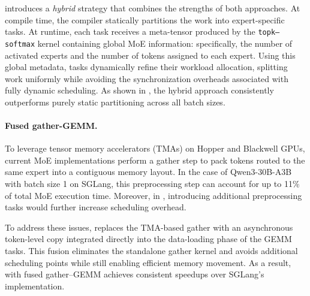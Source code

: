 \sys introduces a {\em hybrid} strategy that combines the strengths of both approaches. At compile time, the compiler statically partitions the work into expert-specific tasks. At runtime, each task receives a meta-tensor produced by the {\tt topk–softmax} kernel containing global MoE information: specifically, the number of activated experts and the number of tokens assigned to each expert. Using this global metadata, tasks dynamically refine their workload allocation, splitting work uniformly while avoiding the synchronization overheads associated with fully dynamic scheduling.
As shown in , the hybrid approach consistently outperforms purely static partitioning across all batch sizes.

\paragraph{Fused gather-GEMM.} 
To leverage tensor memory accelerators (TMAs) on Hopper and Blackwell GPUs, current MoE implementations perform a gather step to pack tokens routed to the same expert into a contiguous memory layout. In the case of Qwen3-30B-A3B with batch size 1 on SGLang, this preprocessing step can account for up to 11\% of total MoE execution time. Moreover, in \sys, introducing additional preprocessing tasks would further increase scheduling overhead.

To address these issues, \sys replaces the TMA-based gather with an asynchronous token-level copy integrated directly into the data-loading phase of the GEMM tasks. This fusion eliminates the standalone gather kernel and avoids additional scheduling points while still enabling efficient memory movement. As a result, \sys with fused gather–GEMM achieves consistent speedups over SGLang’s implementation.

